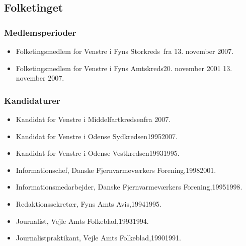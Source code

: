 \documentclass[11pt, a4paper]{awesome-cv}
\begin{document}
\begin{cvletter}
\subsection*{Folketinget}
\subsubsection*{Medlemsperioder}
\begin{itemize}
\item Folketingsmedlem for Venstre i Fyns Storkreds fra 13. november 2007.
\item Folketingsmedlem for Venstre i Fyns Amtskreds20. november 2001  13. november 2007.
\end{itemize}
\subsubsection*{Kandidaturer}
\begin{itemize}
\item Kandidat for Venstre i Middelfartkredsenfra 2007.
\item Kandidat for Venstre i Odense Sydkredsen19952007.
\item Kandidat for Venstre i Odense Vestkredsen19931995.
\end{itemize}
\begin{itemize}
\item Informationschef, Danske Fjernvarmeværkers Forening,19982001.
\item Informationsmedarbejder, Danske Fjernvarmeværkers Forening,19951998.
\item Redaktionssekretær, Fyns Amts Avis,19941995.
\item Journalist, Vejle Amts Folkeblad,19931994.
\item Journalistpraktikant, Vejle Amts Folkeblad,19901991.
\end{itemize}
\end{cvletter}
\end{document}
